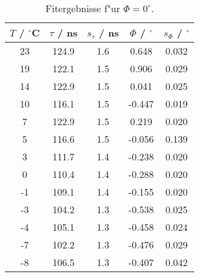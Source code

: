 \begin{table}[H]
\caption{Fitergebnisse f"ur $\Phi=0^\circ$.}
\begin{center}
\begin{tabular}{|c|c|c|c|c|}
  \hline
  $T$ / ${}^{\circ}$C & $\tau$ / ns & $s_{\tau}$ / ns & $\Phi$ / ${}^{\circ}$ & $s_{\Phi}$ / ${}^{\circ}$ \\ \hline
  23 & 124.9 & 1.6 & 0.648 & 0.032 \\ \hline
  19 & 122.1 & 1.5 & 0.906 & 0.029 \\ \hline
  14 & 122.9 & 1.5 & 0.041 & 0.025 \\ \hline
  10 & 116.1 & 1.5 & -0.447 & 0.019 \\ \hline
  7 & 122.9 & 1.5 & 0.219 & 0.020 \\ \hline
  5 & 116.6 & 1.5 & -0.056 & 0.139 \\ \hline
  3 & 111.7 & 1.4 & -0.238 & 0.020 \\ \hline
  0 & 110.4 & 1.4 & -0.288 & 0.020 \\ \hline
  -1 & 109.1 & 1.4 & -0.155 & 0.020 \\ \hline
  -3 & 104.2 & 1.3 & -0.538 & 0.025 \\ \hline
  -4 & 105.1 & 1.3 & -0.458 & 0.024 \\ \hline
  -7 & 102.2 & 1.3 & -0.476 & 0.029 \\ \hline
  -8 & 106.5 & 1.3 & -0.407 & 0.042 \\ \hline
\end{tabular}
\end{center}
\label{tab:phi:0}
\end{table}
